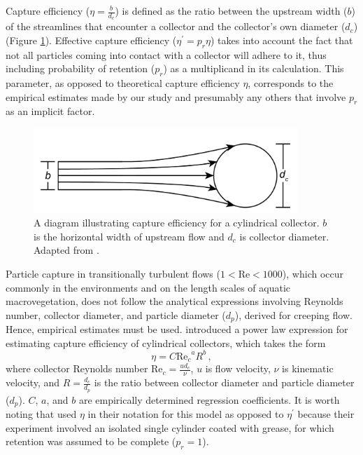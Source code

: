 \documentclass{scrreprt}
\newcommand\Rey{\mathrm{Re}}
\begin{document}
Capture efficiency ($\eta=\frac{b}{d_c}$) is defined as the ratio between the upstream width ($b$) of the streamlines that encounter a collector and the collector's own diameter ($d_c$) (Figure \ref{fig:capeff}). Effective capture efficiency ($\eta^\prime=p_r\eta$) takes into account the fact that not all particles coming into contact with a collector will adhere to it, thus including probability of retention ($p_r$) as a multiplicand in its calculation. This parameter, as opposed to theoretical capture efficiency $\eta$, corresponds to the empirical estimates made by our study and presumably any others that involve $p_r$ as an implicit factor.

\begin{figure}[htbp]
\includegraphics[width=10cm]{collectorefficiency.png}
\centering
\caption{A diagram illustrating capture efficiency for a cylindrical collector. $b$ is the horizontal width of upstream flow and $d_c$ is collector diameter. Adapted from \cite{Palmer_2004}.}
\label{fig:capeff}
\end{figure}

Particle capture in transitionally turbulent flows ($1<\Rey<1000$), which occur commonly in the environments and on the length scales of aquatic macrovegetation, does not follow the analytical expressions involving Reynolds number, collector diameter, and particle diameter ($d_p$), derived for creeping flow. Hence, empirical estimates must be used. \cite{Palmer_2004} introduced a power law expression for estimating capture efficiency of cylindrical collectors, which takes the form 
\begin{equation}
    \eta=C{\Rey_c}^{a}R^{b}\,,
    \label{eq:powerlaw}
\end{equation}
where collector Reynolds number $\Rey_c=\frac{ud_c}{\nu}$, $u$ is flow velocity, $\nu$ is kinematic velocity, and $R=\frac{d_c}{d_p}$ is the ratio between collector diameter and particle diameter ($d_p$). $C$, $a$, and $b$ are empirically determined regression coefficients. It is worth noting that \cite{Palmer_2004} used $\eta$ in their notation for this model as opposed to $\eta^\prime$ because their experiment involved an isolated single cylinder coated with grease, for which retention was assumed to be complete ($p_r = 1$).
\end{document}
